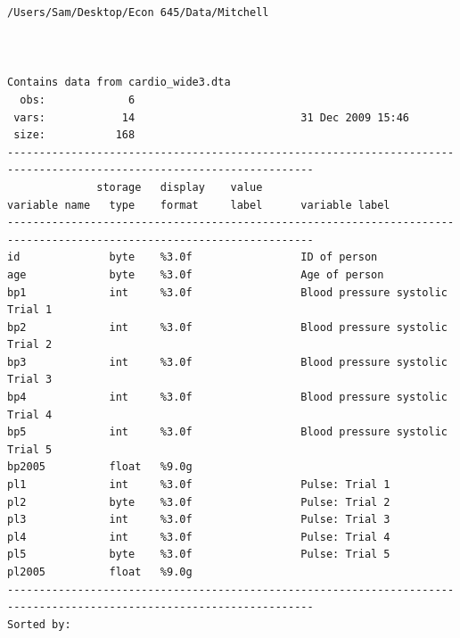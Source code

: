 \documentclass[
]{book}
\begin{document}
\begin{verbatim}
/Users/Sam/Desktop/Econ 645/Data/Mitchell



Contains data from cardio_wide3.dta
  obs:             6                          
 vars:            14                          31 Dec 2009 15:46
 size:           168                          
----------------------------------------------------------------------------------------------------------------------
              storage   display    value
variable name   type    format     label      variable label
----------------------------------------------------------------------------------------------------------------------
id              byte    %3.0f                 ID of person
age             byte    %3.0f                 Age of person
bp1             int     %3.0f                 Blood pressure systolic Trial 1
bp2             int     %3.0f                 Blood pressure systolic Trial 2
bp3             int     %3.0f                 Blood pressure systolic Trial 3
bp4             int     %3.0f                 Blood pressure systolic Trial 4
bp5             int     %3.0f                 Blood pressure systolic Trial 5
bp2005          float   %9.0g                 
pl1             int     %3.0f                 Pulse: Trial 1
pl2             byte    %3.0f                 Pulse: Trial 2
pl3             int     %3.0f                 Pulse: Trial 3
pl4             int     %3.0f                 Pulse: Trial 4
pl5             byte    %3.0f                 Pulse: Trial 5
pl2005          float   %9.0g                 
----------------------------------------------------------------------------------------------------------------------
Sorted by: 




\end{verbatim}
\end{document}
